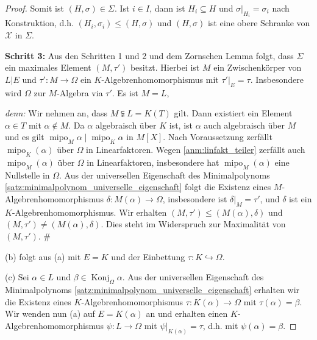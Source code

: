 \documentclass[a4paper, twoside, 11pt, ngerman]{report}
\newcommand{\calX}{\mathcal X}
\DeclareMathOperator{\Konj}{Konj}
\DeclareMathOperator{\mipo}{mipo}
\theoremstyle{definistyle}
\theoremstyle{remark}
\newenvironment{denn}%
  {\par\textit{denn:}}%
  {\hfill\#\par}
\begin{document}
\begin{proof}
Somit ist $(H, \sigma) \in \Sigma$. Ist $i\in I$, dann ist $H_i \subseteq H$ und $\sigma|_{H_i} = \sigma_i$ nach Konstruktion, d.h. $(H_i, \sigma_i) \leq (H, \sigma)$ und $(H, \sigma)$ ist eine obere Schranke von $\calX$ in $\Sigma$.

\textbf{Schritt 3:} Aus den Schritten 1 und 2 und dem Zornschen Lemma folgt, dass 
$\Sigma$ ein maximales Element $(M, \tau')$ besitzt. Hierbei ist $M$ ein Zwischenkörper von $L|E$ und $\tau' \colon M \to \Omega$ ein $K$-Algebrenhomomorphismus mit $\tau'|_E = \tau$. Insbesondere wird $\Omega$ zur $M$-Algebra via $\tau'$. Es ist $M = L$,
\begin{denn}
Wir nehmen an, dass $M\subsetneqq L=K(T)$ gilt. Dann existiert ein Element $\alpha\in T$ mit $\alpha\not\in M$.
Da $\alpha$ algebraisch über $K$ ist, ist $\alpha$ auch algebraisch über $M$ und es gilt $\mipo_M\alpha\mid\mipo_K\alpha$
in $M[X]$. Nach Voraussetzung zerfällt $\operatorname{mipo}_K(\alpha)$ über $\Omega$ in Linearfaktoren. 
Wegen \ref{anm:linfakt_teiler} zerfällt auch $\operatorname{mipo}_M(\alpha)$ über $\Omega$ in Linearfaktoren,
insbesondere hat $\operatorname{mipo}_M(\alpha)$ eine Nullstelle in $\Omega$. Aus der universellen Eigenschaft des Minimalpolynoms \ref{satz:minimalpolynom_universelle_eigenschaft} folgt die Existenz eines 
$M$-Algebrenhomomorphismus $\delta \colon M(\alpha) \to \Omega$, insbesondere ist $\delta|_{M}=\tau'$, und $\delta$
ist ein $K$-Algebrenhomomorphismus. Wir erhalten $(M,\tau')\leq(M(\alpha),\delta)$ und $(M,\tau')\neq(M(\alpha),\delta)$.
Dies steht im Widerspruch zur Maximalität von $(M,\tau')$.
\end{denn}
(b) folgt aus (a) mit $E = K$ und der Einbettung $\tau\colon K\hookrightarrow\Omega$.

(c) Sei $\alpha\in L$ und $\beta\in\Konj_\Omega\alpha$.
Aus der universellen Eigenschaft des Minimalpolynoms \ref{satz:minimalpolynom_universelle_eigenschaft} erhalten wir die Existenz eines $K$-Algebrenhomomorphismus $\tau\colon K(\alpha)\to\Omega$ mit $\tau(\alpha)=\beta$.
Wir wenden nun (a) auf $E=K(\alpha)$ an und erhalten einen $K$-Algebrenhomomorphismus $\psi \colon L \to \Omega$ mit $\psi|_{K(\alpha)} = \tau$, d.h. mit $\psi(\alpha) = \beta$.
\end{proof}
\end{document}
